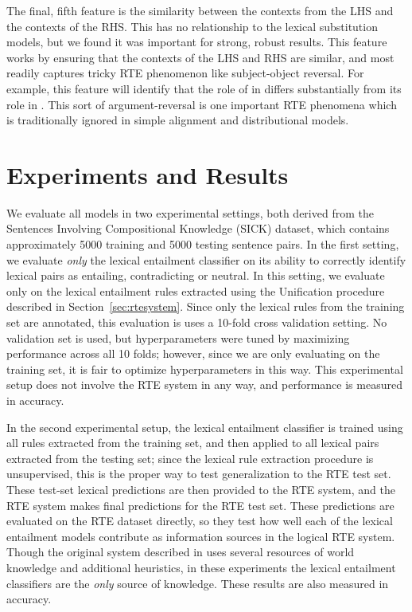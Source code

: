 The final, fifth feature is the similarity between the contexts from the LHS
and the contexts of the RHS. This has no relationship to the lexical
substitution models, but we found it was important for strong, robust results.
This feature works by ensuring that the contexts of the LHS and RHS are
similar, and most readily captures tricky RTE phenomenon like subject-object
reversal.  For example, this feature will identify that the role of 
in  differs substantially from its role in . This sort of argument-reversal is one important RTE phenomena which
is traditionally ignored in simple alignment and distributional models.

\section{Experiments and Results}

We evaluate all models in two experimental settings, both derived from the
Sentences Involving Compositional Knowledge (SICK) dataset, which contains
approximately 5000 training and 5000 testing sentence pairs. In the first
setting, we evaluate {\em only} the lexical entailment classifier on its
ability to correctly identify lexical pairs as entailing, contradicting or
neutral. In this setting, we evaluate only on the lexical entailment rules
extracted using the Unification procedure described in
Section~\ref{sec:rtesystem}. Since only the lexical rules from the training set
are annotated, this evaluation is uses a 10-fold cross validation setting.  No
validation set is used, but hyperparameters were tuned by maximizing
performance across all 10 folds; however, since we are only evaluating on the
training set, it is fair to optimize hyperparameters in this way. This
experimental setup does not involve the RTE system in any way, and performance
is measured in accuracy.

In the second experimental setup, the lexical entailment classifier is trained
using all rules extracted from the training set, and then applied to all
lexical pairs extracted from the testing set; since the lexical rule extraction
procedure is unsupervised, this is the proper way to test generalization to the
RTE test set. These test-set lexical predictions are then provided to the RTE
system, and the RTE system makes final predictions for the RTE test set. These
predictions are evaluated on the RTE dataset directly, so they test how well
each of the lexical entailment models contribute as information sources in the
logical RTE system. Though the original system described in
 uses several resources of world knowledge and
additional heuristics, in these
experiments the lexical entailment classifiers are the {\em only} source of
knowledge. These results are also measured in accuracy.

